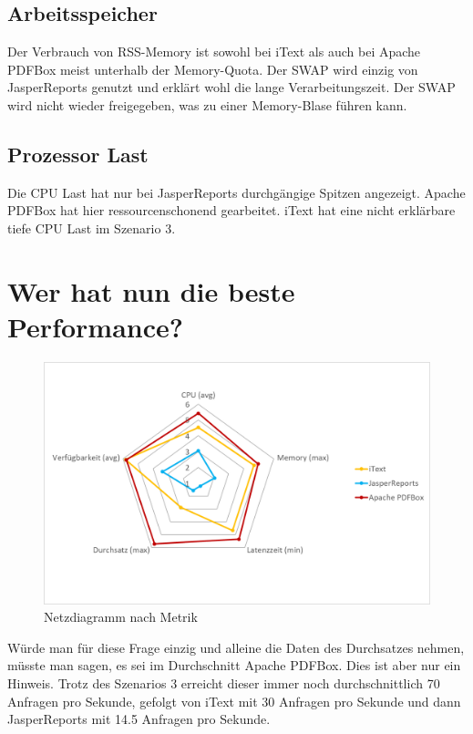 \documentclass[main.tex]{subfiles}
\begin{document}
\subsection{Arbeitsspeicher}
Der Verbrauch von RSS-Memory ist sowohl bei iText als auch bei Apache PDFBox meist unterhalb der Memory-Quota. Der SWAP wird einzig von JasperReports genutzt und erklärt wohl die lange Verarbeitungszeit. Der SWAP wird nicht wieder freigegeben, was zu einer Memory-Blase führen kann.

\subsection{Prozessor Last}
Die CPU Last hat nur bei JasperReports durchgängige Spitzen angezeigt. Apache PDFBox hat hier  ressourcenschonend gearbeitet. iText hat eine nicht erklärbare tiefe CPU Last im Szenario 3.


\section{Wer hat nun die beste Performance?}

\begin{figure}[!hb]
\includegraphics[width=\textwidth]{end/5_erfarhungsbericht/Netzdiagram.png}
 \caption{Netzdiagramm nach Metrik}
 \label{figure:netzdiagrammMetriken}
\end{figure}

Würde man für diese Frage einzig und alleine die Daten des Durchsatzes nehmen, müsste man sagen, es sei im Durchschnitt Apache PDFBox. Dies ist aber nur ein Hinweis. Trotz des Szenarios 3 erreicht dieser immer noch durchschnittlich 70 Anfragen pro Sekunde, gefolgt von iText mit 30 Anfragen pro Sekunde und dann JasperReports mit 14.5 Anfragen pro Sekunde.
\end{document}
